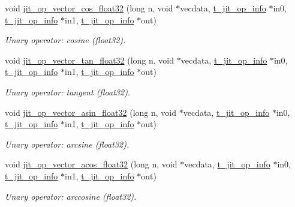 \begin{DoxyCompactItemize}
void \hyperlink{group__opvecmod_gaba8a6b1cff6bf9770ea3994d8be30e38}{jit\_\-op\_\-vector\_\-cos\_\-float32} (long n, void $\ast$vecdata, \hyperlink{structt__jit__op__info}{t\_\-jit\_\-op\_\-info} $\ast$in0, \hyperlink{structt__jit__op__info}{t\_\-jit\_\-op\_\-info} $\ast$in1, \hyperlink{structt__jit__op__info}{t\_\-jit\_\-op\_\-info} $\ast$out)
\begin{DoxyCompactList}\small\item\em Unary operator: cosine (float32). \item\end{DoxyCompactList}\item 
void \hyperlink{group__opvecmod_ga57204f20348af7decab1537293a7d55d}{jit\_\-op\_\-vector\_\-tan\_\-float32} (long n, void $\ast$vecdata, \hyperlink{structt__jit__op__info}{t\_\-jit\_\-op\_\-info} $\ast$in0, \hyperlink{structt__jit__op__info}{t\_\-jit\_\-op\_\-info} $\ast$in1, \hyperlink{structt__jit__op__info}{t\_\-jit\_\-op\_\-info} $\ast$out)
\begin{DoxyCompactList}\small\item\em Unary operator: tangent (float32). \item\end{DoxyCompactList}\item 
void \hyperlink{group__opvecmod_ga796ea33b72e94a4ceef0077be3def292}{jit\_\-op\_\-vector\_\-asin\_\-float32} (long n, void $\ast$vecdata, \hyperlink{structt__jit__op__info}{t\_\-jit\_\-op\_\-info} $\ast$in0, \hyperlink{structt__jit__op__info}{t\_\-jit\_\-op\_\-info} $\ast$in1, \hyperlink{structt__jit__op__info}{t\_\-jit\_\-op\_\-info} $\ast$out)
\begin{DoxyCompactList}\small\item\em Unary operator: arcsine (float32). \item\end{DoxyCompactList}\item 
void \hyperlink{group__opvecmod_gacae820f353fd3677af02f3690d9beebf}{jit\_\-op\_\-vector\_\-acos\_\-float32} (long n, void $\ast$vecdata, \hyperlink{structt__jit__op__info}{t\_\-jit\_\-op\_\-info} $\ast$in0, \hyperlink{structt__jit__op__info}{t\_\-jit\_\-op\_\-info} $\ast$in1, \hyperlink{structt__jit__op__info}{t\_\-jit\_\-op\_\-info} $\ast$out)
\begin{DoxyCompactList}\small\item\em Unary operator: arccosine (float32). \item\end{DoxyCompactList}\item 

\end{DoxyCompactItemize}
